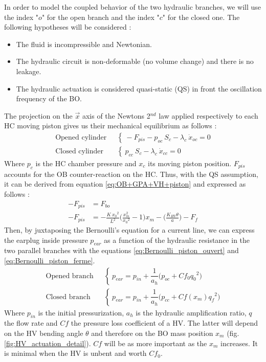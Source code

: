 \documentclass[3p,twocolumn,preprint]{elsarticle}
\begin{document}
In order to model the coupled behavior of the two hydraulic branches, we will use the index "$o$" for the open branch and the index "$c$" for the closed one. The following hypotheses will be considered :
\begin{itemize}
	\item The fluid is incompressible and Newtonian.
	\item The hydraulic circuit is non-deformable (no volume change) and there is no leakage.
	\item The hydraulic actuation is considered quasi-static (QS) in front
	the oscillation frequency of the BO.
\end{itemize}
The projection on the $\vec{x}$ axis of the Newtons 2$^{nd}$ law applied respectively to each HC moving piston gives us their mechanical equilibrium as follows :
\begin{align}
	\text{Opened cylinder ~}& \left\{~
	-F_{pis} - p_{oc}\ S_{c} - \lambda_{c}\ \dot{x}_{oc} = 0
	\right.
	\label{eq:equilibre_dynamique_piston_ouvert}\\
	\text{Closed cylinder ~}& \left\{~
	p_{cc}\ S_{c} - \lambda_{c}\ \dot{x}_{cc} = 0
	\right.
	\label{eq:equilibre_dynamique_piston_ferme}
\end{align}
Where $p_c$ is the HC chamber pressure and $x_c$ its moving piston position. $F_{pis}$ accounts for the OB counter-reaction on the HC. Thus, with the QS assumption, it can be derived from equation \ref{eq:OB+GPA+VH+piston} and expressed as follows : 
\begin{align}
	-F_{pis} & = F_{bo}\\
	-F_{pis} & = -\frac{K\ {x_0}^2}{L^2}\biggl(\frac{x_m^2}{{x_0}^2} -1\biggr)x_m - \biggl( \frac{K_{HV}\theta}{a} \biggr) - F_f
	\label{eq:F_OB_xxxxxx}
\end{align}
Then, by juxtaposing the Bernoulli's equation for a current line, we can express the earplug inside pressure $p_{ear}$ as a function of the hydraulic resistance in the two parallel branches with the equations \ref{eq:Bernoulli_piston_ouvert} and \ref{eq:Bernoulli_piston_ferme}.
\begin{align}
	\text{Opened branch ~}& \left\{~
	p_{ear} = p_{in} + \dfrac{1}{a_h}\biggl(p_{oc} + Cf_0 {q_0}^2 \biggr)
	\right.
	\label{eq:Bernoulli_piston_ouvert}\\
	\text{Closed branch ~}& \left\{~
	p_{ear} = p_{in} + \dfrac{1}{a_h}\biggl(p_{cc} + Cf(x_m) {q_f}^2 \biggr)
	\right.
	\label{eq:Bernoulli_piston_ferme}
\end{align}
Where $p_{in}$ is the initial pressurization, $a_h$ is the hydraulic amplification ratio, $q$ the flow rate and $Cf$ the pressure loss coefficient of a HV. The latter will depend on the HV bending angle $\theta$ and therefore on the BO mass position $x_m$ (fig. \ref{fig:HV_actuation_detail}). $Cf$ will be as more important as the $x_m$ increases. It is minimal when the HV is unbent and worth $Cf_0$.
\end{document}
